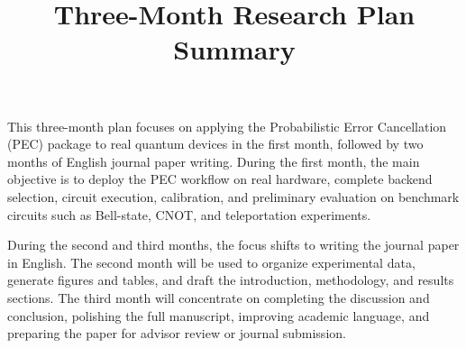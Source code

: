 \documentclass[12pt]{article}
\title{Three-Month Research Plan Summary}
\author{}
\date{}
\begin{document}
\maketitle
\onehalfspacing

This three-month plan focuses on applying the Probabilistic Error Cancellation (PEC) package to real quantum devices in the first month, followed by two months of English journal paper writing. During the first month, the main objective is to deploy the PEC workflow on real hardware, complete backend selection, circuit execution, calibration, and preliminary evaluation on benchmark circuits such as Bell-state, CNOT, and teleportation experiments.

During the second and third months, the focus shifts to writing the journal paper in English. The second month will be used to organize experimental data, generate figures and tables, and draft the introduction, methodology, and results sections. The third month will concentrate on completing the discussion and conclusion, polishing the full manuscript, improving academic language, and preparing the paper for advisor review or journal submission.
\end{document}
